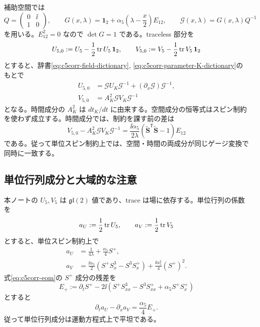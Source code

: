 補助空間では
\begin{equation}
Q=\begin{pmatrix}0&\ii\\1&0\end{pmatrix},
\qquad
G(x,\lambda)=\mathbf1_2+\alpha_5\left(\lambda-\frac{x}{2}\right)E_{12},
\qquad
\mathcal G(x,\lambda)=G(x,\lambda)Q^{-1}
\label{eq:c5corr-gauge}
\end{equation}
を用いる。$E_{12}^2=0$ なので $\det G=1$ である。traceless 部分を
\begin{equation}
U_{5,0}:=U_5-\frac12\operatorname{tr} U_5\,\mathbf1_2,
\qquad
V_{5,0}:=V_5-\frac12\operatorname{tr} V_5\,\mathbf1_2
\end{equation}
とすると、辞書\eqref{eq:c5corr-field-dictionary}, \eqref{eq:c5corr-parameter-K-dictionary}のもとで
\begin{align}
U_{5,0}
&=\mathcal G U_K\mathcal G^{-1}
+(\partial_x\mathcal G)\mathcal G^{-1},
\label{eq:c5corr-Uidentity}\\
V_{5,0}
&=A_K^2\mathcal G V_K\mathcal G^{-1}
\label{eq:c5corr-Videntity}
\end{align}
となる。時間成分の $A_K^2$ は $dt_K/dt$ に由来する。空間成分の恒等式はスピン制約を使わず成立する。時間成分では、制約を課す前の差は
\begin{equation}
V_{5,0}-A_K^2\mathcal G V_K\mathcal G^{-1}
=\frac{\ii\alpha_5}{2\lambda}
(\widetilde{\boldsymbol S}^{\mathsf T}\widetilde{\boldsymbol S}-1)E_{12}
\label{eq:c5corr-offshell-difference}
\end{equation}
である。従って単位スピン制約上では、空間・時間の両成分が同じゲージ変換で同時に一致する。

\subsection{単位行列成分と大域的な注意}

本ノートの $U_5,V_5$ は $\mathfrak{gl}(2)$ 値であり、trace は場に依存する。単位行列の係数を
\begin{equation}
a_U:=\frac12\operatorname{tr} U_5,
\qquad a_V:=\frac12\operatorname{tr} V_5
\end{equation}
とすると、単位スピン制約上で
\begin{align}
a_U&=\frac1{4\lambda}+\frac{\alpha_5}{4}S^+,
\\
a_V&=\frac{\ii\alpha_5}{2}(S^+S_x^3-S^3S_x^+)
+\frac{\ii\alpha_5^2}{4}(S^+)^2.
\end{align}
式\eqref{eq:c5corr-eom}の $S^+$ 成分の残差を
\begin{equation}
E_+:=\partial_tS^+
-2\ii(S^+S_{xx}^3-S^3S_{xx}^++\alpha_5S^+S_x^+)
\end{equation}
とすると
\begin{equation}
\partial_ta_U-\partial_xa_V=\frac{\alpha_5}{4}E_+.
\end{equation}
従って単位行列成分は運動方程式上で平坦である。

